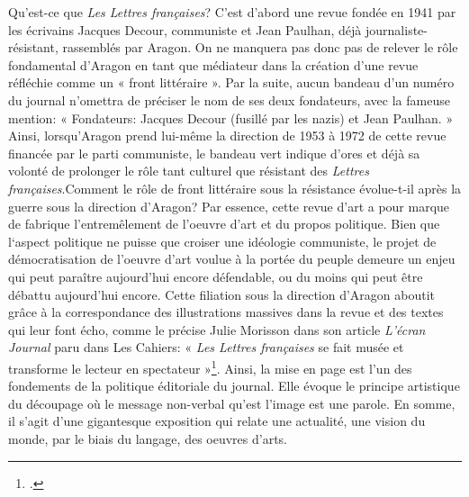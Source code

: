 Qu'est-ce que \emph{Les Lettres françaises}? C'est d'abord une revue fondée en 1941 par les écrivains Jacques Decour, communiste et Jean Paulhan, déjà journaliste-résistant, rassemblés par Aragon. On ne manquera pas donc pas de relever le rôle fondamental d'Aragon en tant que médiateur dans la création d'une revue réfléchie comme un « front littéraire ». Par la suite, aucun bandeau d'un numéro du journal n'omettra de préciser le nom de ses deux fondateurs, avec la fameuse mention: « Fondateurs: Jacques Decour (fusillé par les nazis) et Jean Paulhan. » Ainsi, lorsqu'Aragon prend lui-même la direction de 1953 à 1972 de cette revue financée par le parti communiste, le bandeau vert indique d'ores et déjà sa volonté de prolonger le rôle tant culturel que résistant des \emph{Lettres françaises}.Comment le rôle de front littéraire sous la résistance évolue-t-il après la guerre sous la direction d'Aragon? Par essence, cette revue d'art a pour marque de fabrique l'entremêlement de l'oeuvre d'art et du propos politique. Bien que l‘aspect politique ne puisse que croiser une idéologie communiste, le projet de démocratisation de l'oeuvre d'art voulue à la portée du peuple demeure un enjeu qui peut paraître aujourd'hui encore défendable, ou du moins qui peut être débattu aujourd'hui encore. Cette filiation sous la direction d'Aragon aboutit grâce à la correspondance des illustrations massives dans la revue et des textes qui leur font écho, comme le précise Julie Morisson dans son article \emph{L'écran Journal} paru dans Les Cahiers: « \emph{Les Lettres françaises} se fait musée et transforme le lecteur en spectateur »\footcite[p.169-172]{cahiers}. Ainsi, la mise en page est l'un des fondements de la politique éditoriale du journal. Elle évoque le principe artistique du découpage où le message non-verbal qu'est l'image est une parole. En somme, il s'agit d'une gigantesque exposition qui relate une actualité, une vision du monde, par le biais du langage, des oeuvres d'arts.

